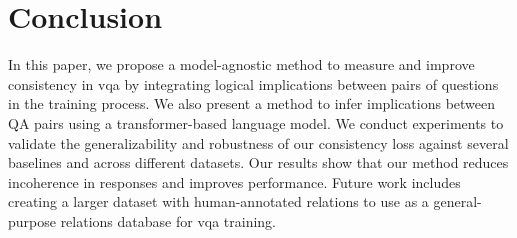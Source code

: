 \section{Conclusion}

In this paper, we propose a model-agnostic method to measure and improve consistency in \gls{vqa} by integrating logical implications between pairs of questions in the training process. We also present a method to infer implications between QA pairs using a transformer-based language model. We conduct experiments to validate the generalizability and robustness of our consistency loss against several baselines and across different datasets. Our results show that our method reduces incoherence in responses and improves performance. Future work includes creating a larger dataset with human-annotated relations to use as a general-purpose relations database for \gls{vqa} training.